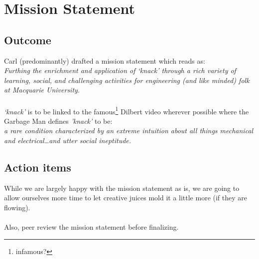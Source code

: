 \section{Mission Statement}
\label{sec:MissionStatement}
\subsection{Outcome}
Carl (predominantly) drafted a mission statement which reads as:\\

\emph{Furthing the enrichment and application of `knack' through a rich variety
of learning, social, and challenging activities for engineering (and like minded)
folk at Macquarie University.}\\
\\
\emph{`knack'} is to be linked to the famous\footnote{infamous?} Dilbert video
wherever possible where the Garbage Man defines \emph{'knack'} to be:\\

\emph{a rare condition characterized by an extreme intuition about all things
mechanical and electrical\ldots and utter social ineptitude.}

\subsection{Action items}
While we are largely happy with the mission statement as is, we are going to
allow ourselves more time to let creative juices mold it a little more (if they
are flowing).\\
\\
Also, peer review the mission statement before finalizing.

